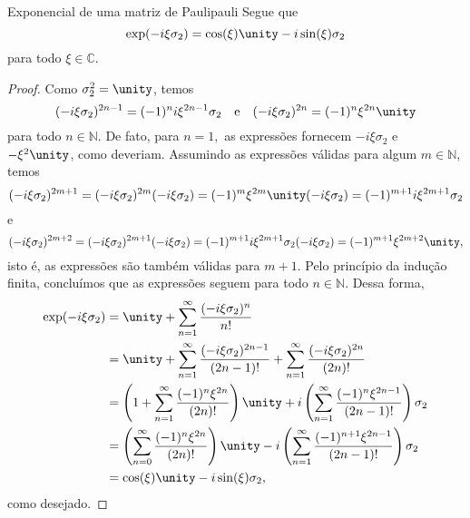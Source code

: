 \begin{lemma}{Exponencial de uma matriz de Pauli}{pauli}
    Segue que
    \begin{equation*}
        \exp(-i \xi \sigma_2) = \cos(\xi)\unity - i\sin(\xi) \sigma_2
    \end{equation*}
    para todo \(\xi \in \mathbb{C}\).
\end{lemma}
\begin{proof}
    Como \(\sigma_2^2 = \unity\), temos
    \begin{equation*}
        (-i \xi \sigma_2)^{2n - 1} = (-1)^{n} i\xi^{2n - 1} \sigma_2
        \quad\text{e}\quad
        (-i \xi \sigma_2)^{2n} = (-1)^n \xi^{2n} \unity
    \end{equation*}
    para todo \(n \in \mathbb{N}\). De fato, para \(n = 1,\) as expressões fornecem \(-i \xi \sigma_2\) e \(-\xi^2 \unity\), como deveriam. Assumindo as expressões válidas para algum \(m \in \mathbb{N}\), temos
    \begin{equation*}
        (-i \xi \sigma_2)^{2m + 1} = (-i \xi \sigma_2)^{2m} (-i\xi \sigma_2) = (-1)^m \xi^{2m} \unity (-i \xi \sigma_2) = (-1)^{m+1}i\xi^{2m + 1} \sigma_2
    \end{equation*}
    e
    \begin{equation*}
        (-i \xi \sigma_2)^{2m + 2} = (-i \xi \sigma_2)^{2m + 1} (-i \xi \sigma_2) = (-1)^{m+1} i\xi^{2m + 1} \sigma_2 (-i \xi \sigma_2) = (-1)^{m+1} \xi^{2m + 2} \unity,
    \end{equation*}
    isto é, as expressões são também válidas para \(m + 1\). Pelo princípio da indução finita, concluímos que as expressões seguem para todo \(n \in \mathbb{N}\). Dessa forma,
    \begin{align*}
        \exp(-i \xi \sigma_2) &= \unity + \sum_{n = 1}^\infty \frac{(-i \xi \sigma_2)^n}{n!}\\
                              &= \unity + \sum_{n = 1}^\infty \frac{(-i \xi \sigma_2)^{2n - 1}}{(2n -1)!} + \sum_{n = 1}^\infty \frac{(-i \xi \sigma_2)^{2n}}{(2n)!}\\
                              &= \left(1 + \sum_{n = 1}^\infty \frac{(-1)^n \xi^{2n}}{(2n)!}\right)\unity + i \left(\sum_{n = 1}^\infty \frac{(-1)^n \xi^{2n - 1}}{(2n - 1)!}\right) \sigma_2\\
                              &= \left(\sum_{n = 0}^\infty \frac{(-1)^n \xi^{2n}}{(2n)!}\right)\unity - i \left(\sum_{n = 1}^\infty \frac{(-1)^{n+1} \xi^{2n - 1}}{(2n - 1)!}\right)\sigma_2\\
                              &= \cos(\xi)\unity - i\sin(\xi)\sigma_2,
    \end{align*}
    como desejado.
\end{proof}
